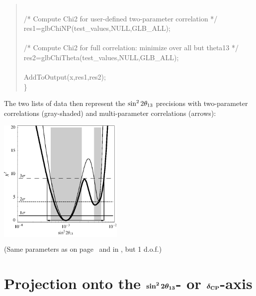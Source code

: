 {\begin{quote}
{{ \\
\hspace*{0.5cm} /* Compute Chi2 for user-defined two-parameter correlation */ \\
\hspace*{0.5cm} res1=glbChiNP(test\_values,NULL,GLB\_ALL); \\
      \\
\hspace*{0.5cm} /* Compute Chi2 for full correlation: minimize over all but theta13 */ \\
\hspace*{0.5cm} res2=glbChiTheta(test\_values,NULL,GLB\_ALL); \\
  \\
\hspace*{0.5cm} AddToOutput(x,res1,res2);\\
  \} \\
  
}}
\end{quote}
The two lists of data then represent the $\stheta$ precisions with two-parameter correlations (gray-shaded) and multi-parameter correlations (arrows):
\begin{center}
\colorbox{white}{\includegraphics[width=6cm]{projallex}}

\vspace*{0.1cm}

\footnotesize{(Same parameters as on page~\pageref{ex:corrth13dcp} and in , but 1 d.o.f.)}
\end{center}
}
\section[Projection onto the $\stheta$-axis or $\deltacp$-axis]{Projection onto the $\boldsymbol{\sin^2 2 \theta_{13}}$- or $\boldsymbol{\delta_{\mathrm{CP}}}$-axis}

